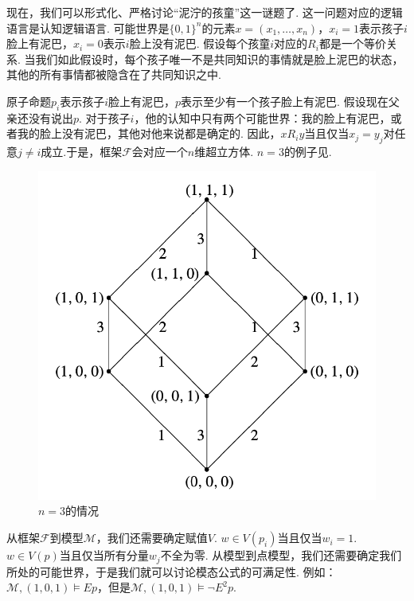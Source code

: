 现在，我们可以形式化、严格讨论“泥泞的孩童”这一谜题了. 这一问题对应的逻辑语言是认知逻辑语言. 可能世界是$\{0,1\}^n$的元素$x=(x_1,\dots,x_n)$，$x_i=1$表示孩子$i$脸上有泥巴，$x_i=0$表示$i$脸上没有泥巴. 假设每个孩童$i$对应的$R_i$都是一个等价关系. 当我们如此假设时，每个孩子唯一不是共同知识的事情就是脸上泥巴的状态，其他的所有事情都被隐含在了共同知识之中.

原子命题$p_i$表示孩子$i$脸上有泥巴，$p$表示至少有一个孩子脸上有泥巴. 假设现在父亲还没有说出$p$. 对于孩子$i$，他的认知中只有两个可能世界：我的脸上有泥巴，或者我的脸上没有泥巴，其他对他来说都是确定的. 因此，$x R_i y$当且仅当$x_j=y_j$对任意$j\neq i$成立.于是，框架$\mathcal F$会对应一个$n$维超立方体. $n=3$的例子见.

\begin{figure}[ht]
    \centering
    \includegraphics[scale=0.4]{Figures/epistemic-logic/cubic-example.png}
    \caption{$n=3$的情况}
    \label{fig:cubic-example}
\end{figure}

从框架$\mathcal F$到模型$\mathcal M$，我们还需要确定赋值$V$. $w\in V(p_i)$当且仅当$w_i=1$. $w\in V(p)$当且仅当所有分量$w_j$不全为零. 从模型到点模型，我们还需要确定我们所处的可能世界，于是我们就可以讨论模态公式的可满足性. 例如：$\mathcal M,(1,0,1)\vDash Ep$，但是$\mathcal M,(1,0,1)\vDash \neg E^2p$. 

